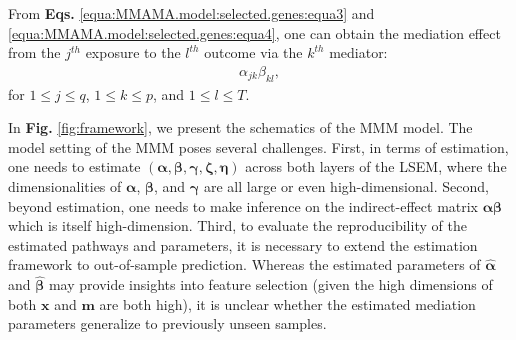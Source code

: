 \documentclass[
  12pt]{article}
\def\M{\mathbf{m}}
\def\X{\mathbf{x}}
\def\Y{\mathbf{y}}
\def\Z{\mathbf{z}}
\begin{document}

From \textbf{Eqs.} \eqref{equa:MMAMA.model:selected.genes:equa3} and \eqref{equa:MMAMA.model:selected.genes:equa4}, one can obtain the mediation effect from the $j^{th}$ exposure to the $l^{th}$ outcome via the $k^{th}$ mediator:
\begin{align}
	\alpha_{jk} \beta_{kl},
\end{align}
for $1 \le j \le q$, $1 \le k \le p$, and $1 \le l \le T$.

In \textbf{Fig.} \ref{fig:framework}, we present the schematics of the MMM model. The model setting of the MMM poses several challenges. First, in terms of estimation, one needs to estimate $(\bm{\alpha},\bm{\beta}, \bm{\gamma},\bm{\zeta},\bm{\eta})$ across both layers of the LSEM, where the dimensionalities of $\bm{\alpha}$, $\bm{\beta}$, and  $\bm{\gamma}$ are all large or even high-dimensional. Second, beyond estimation, one needs to make inference on the indirect-effect matrix $\bm{\alpha}\bm{\beta}$ which is itself high-dimension. Third, to evaluate the reproducibility of the estimated pathways and parameters, it is necessary to extend the estimation framework to out-of-sample prediction. Whereas the estimated parameters of $\hat{\bm{\alpha}}$ and $\hat{\bm{\beta}}$ may provide insights into feature selection (given the high dimensions of both $\X$ and $\M$ are both high), it is unclear whether the estimated mediation parameters generalize to previously unseen samples.
\end{document}
